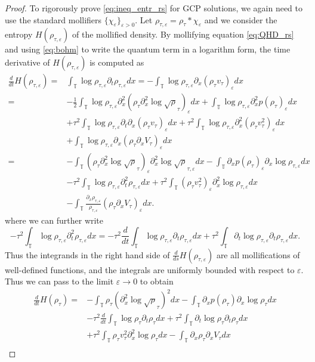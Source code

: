 \documentclass[leqno]{amsart}
\theoremstyle{plain}
\theoremstyle{definition}
\theoremstyle{remark}
\theoremstyle{plain}
\theoremstyle{plain}
\def\T{{\mathbb T}}%
\def\d{{\partial}}
\def\eps{\varepsilon}
\numberwithin{equation}{section}
\begin{document}
\begin{proof}
To rigorously prove \eqref{eq:ineq_entr_rs} for GCP solutions, we again need to use the standard mollifiers $\{\chi_\eps\}_{\eps>0}$. Let $\rho_{\tau,\eps}=\rho_\tau\ast\chi_\eps$ and we consider the entropy $H(\rho_{\tau,\eps})$ of the mollified density. By mollifying equation \eqref{eq:QHD_rs} and using \eqref{eq:bohm} to write the quantum term in a logarithm form, the time derivative of $H(\rho_{\tau,\eps})$ is computed as
\begin{align*}
\frac{d}{dt}H(\rho_{\tau,\eps})=&\int_\T\log\rho_{\tau,\eps}\d_t\rho_{\tau,\eps} dx=-\int_\T\log\rho_{\tau,\eps}\d_x(\rho_\tau v_\tau)_\eps dx\\
=&-\frac12\int_\T\log\rho_{\tau,\eps}\d_x^2(\rho_\tau\d_x^2\log\sqrt\rho_\tau)_\eps dx+\int_\T\log\rho_{\tau,\eps}\d_x^2p(\rho_\tau)_\eps dx\\
&+\tau^2\int_\T\log\rho_{\tau,\eps}\d_t\d_x(\rho_\tau v_\tau)_\eps dx+\tau^2\int_\T\log\rho_{\tau,\eps}\d_x^2(\rho_\tau v_\tau^2)_\eps dx\\
&+\int_\T\log\rho_{\tau,\eps}\d_x(\rho_\tau \d_xV_\tau)_\eps dx\\
=&-\int_\T(\rho_\tau\d_x^2\log\sqrt\rho_\tau)_\eps \d_x^2\log\sqrt\rho_{\tau,\eps}dx-\int_\T \d_xp(\rho_\tau)_\eps\d_x\log \rho_{\tau,\eps}dx\\
&-\tau^2\int_\T\log\rho_{\tau,\eps}\d_t^2\rho_{\tau,\eps} dx+\tau^2\int_\T(\rho_\tau v_\tau^2)_\eps\d_x^2\log\rho_{\tau,\eps} dx\\
&-\int_\T\frac{\d_x\rho_{\tau,\eps}}{\rho_{\tau,\eps}}(\rho_\tau \d_xV_\tau)_\eps dx.
\end{align*}
where we can further write 
\[
-\tau^2\int_\T\log\rho_{\tau,\eps}\d_t^2\rho_{\tau,\eps} dx=-\tau^2\frac{d}{dt}\int_\T\log\rho_{\tau,\eps}\d_t\rho_{\tau,\eps} dx+\tau^2\int_\T\d_t\log\rho_{\tau,\eps}\d_t\rho_{\tau,\eps} dx.
\]
Thus the integrands in the right hand side of $\frac{d}{ds}H(\rho_{\tau,\eps})$ are all mollifications of well-defined functions, and the integrals are uniformly bounded with respect to $\eps$. Thus we can pass to the limit $\eps\to 0$ to obtain
\begin{align*}
\frac{d}{dt}H(\rho_\tau)=&-\int_\T\rho_\tau(\d_x^2\log\sqrt\rho_\tau)^2 dx-\int_\T \d_xp(\rho_\tau)\d_x\log \rho_\tau dx\\
&-\tau^2\frac{d}{dt}\int_\T\log\rho_\tau\d_t\rho_\tau dx+\tau^2\int_\T\d_t\log\rho_\tau\d_t\rho_\tau dx\\
&+\tau^2\int_\T\rho_\tau v_\tau^2\d_x^2\log\rho_\tau dx-\int_\T\d_x\rho_\tau\d_xV_\tau dx\\

\end{align*}
\end{proof}
\end{document}

